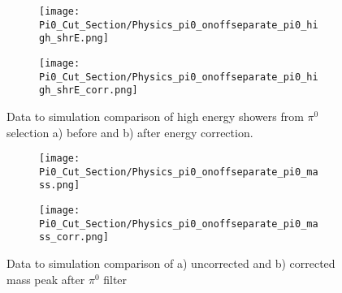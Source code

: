 \begin{figure}[H]
\centering
  \begin{subfigure}[t]{0.3\textwidth}
    \centering
\texttt{[image: Pi0\_Cut\_Section/Physics\_pi0\_onoffseparate\_pi0\_high\_shrE.png]}
  \caption{ }
  \end{subfigure} 
  \hspace{30mm}
  \begin{subfigure}[t]{0.3\textwidth}
    \centering
\texttt{[image: Pi0\_Cut\_Section/Physics\_pi0\_onoffseparate\_pi0\_high\_shrE\_corr.png]}
  \caption{ }
  \end{subfigure} 
\label{fig:physics_pi0_pi0_e}
\caption{ Data to simulation comparison of high energy showers from $\pi^0$ selection a) before and b) after energy correction. }
\end{figure}


\begin{figure}[H]
\centering
  \begin{subfigure}[t]{0.3\textwidth}
    \centering
\texttt{[image: Pi0\_Cut\_Section/Physics\_pi0\_onoffseparate\_pi0\_mass.png]}
 \caption{ }
 \end{subfigure} 
 \hspace{30mm}
  \begin{subfigure}[t]{0.3\textwidth}
    \centering
\texttt{[image: Pi0\_Cut\_Section/Physics\_pi0\_onoffseparate\_pi0\_mass\_corr.png]}
  \caption{ }
  \end{subfigure} 
\caption{ Data to simulation comparison of a) uncorrected and b) corrected mass peak after $\pi^0$ filter }
\label{fig:physics_pi0_mass} 
\end{figure}


